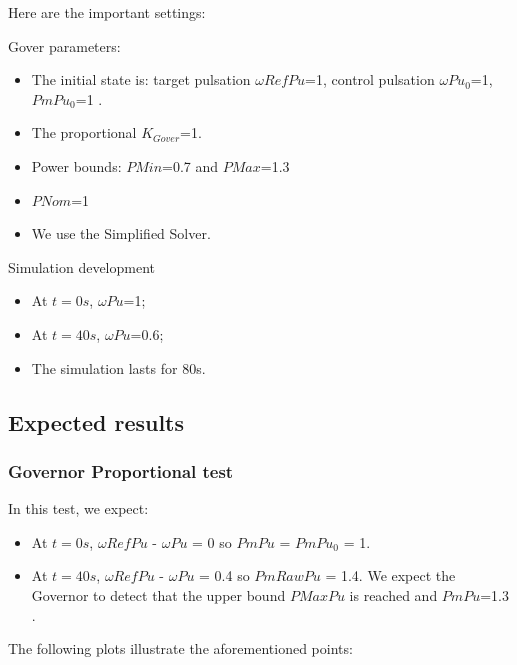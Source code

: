 \documentclass[a4paper, 12pt]{report}
\begin{document}
Here are the important settings:

Gover parameters:
\begin{itemize}
\item The initial state is: target pulsation $\omega RefPu$=1, control pulsation $\omega Pu_0$=1, $PmPu_0$=1 .
\item The proportional $K_{Gover}$=1.
\item Power bounds: $PMin$=0.7 and $PMax$=1.3
\item $PNom$=1
\item We use the Simplified Solver.
\end{itemize}

Simulation development
\begin{itemize}
\item At $t=0s$, $\omega Pu$=1;
\item At $t=40s$, $\omega Pu$=0.6;
\item The simulation lasts for 80s.
\end{itemize}


\subsection*{Expected results}
\subsubsection*{Governor Proportional test}

In this test, we expect:


\begin{itemize}
\item At $t=0s$, $\omega RefPu$ - $\omega Pu$ = 0 so $PmPu$ = $PmPu_0$ = 1.
\item At $t=40s$, $\omega RefPu$ - $\omega Pu$ = 0.4 so $PmRawPu$ = 1.4. We expect the Governor to detect that the upper bound $PMaxPu$ is reached and $PmPu$=1.3 .
\end{itemize}

The following plots illustrate the aforementioned points:
\end{document}
